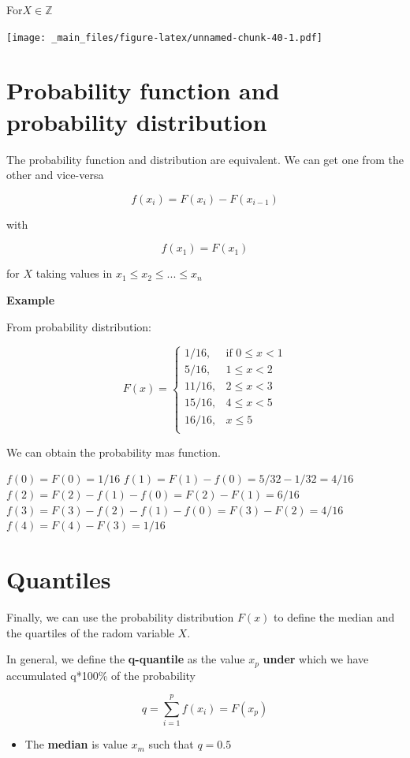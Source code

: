 \documentclass[
]{book}
\providecommand{\tightlist}{%
  \setlength{\itemsep}{0pt}\setlength{\parskip}{0pt}}
\begin{document}
For\(X \in \mathbb{Z}\)

\texttt{[image: \_main\_files/figure-latex/unnamed-chunk-40-1.pdf]}

\hypertarget{probability-function-and-probability-distribution}{%
\section{Probability function and probability distribution}\label{probability-function-and-probability-distribution}}

The probability function and distribution are equivalent. We can get one from the other and vice-versa

\[f(x_i)=F(x_i)-F(x_{i-1})\]

with

\[f(x_1)=F(x_1)\]

for \(X\) taking values in \(x_1 \leq x_2 \leq ... \leq x_n\)

\textbf{Example}

From probability distribution:

\[
    F(x)=
\begin{cases}
    1/16,& \text{if } 0 \leq x < 1\\
    5/16,& 1\leq x < 2\\
    11/16,& 2\leq x < 3\\
    15/16,& 4\leq x < 5\\
    16/16,&  x \leq 5\\
\end{cases}
\]

We can obtain the probability mas function.

\(f(0)=F(0)=1/16\)
\(f(1)=F(1)-f(0)=5/32-1/32=4/16\)
\(f(2)=F(2)-f(1)-f(0)=F(2)-F(1)=6/16\)
\(f(3)=F(3)-f(2)-f(1)-f(0)=F(3)-F(2)=4/16\)
\(f(4)=F(4)-F(3)=1/16\)

\hypertarget{quantiles}{%
\section{Quantiles}\label{quantiles}}

Finally, we can use the probability distribution \(F(x)\) to define the median and the quartiles of the radom variable \(X\).

In general, we define the \textbf{q-quantile} as the value \(x_{p}\) \textbf{under} which we have accumulated q*100\% of the probability

\[q=\sum_{i=1}^p f(x_i) = F (x_p)\]

\begin{itemize}
\tightlist
\item
  The \textbf{median} is value \(x_m\) such that \(q=0.5\)
\end{itemize}
\end{document}
